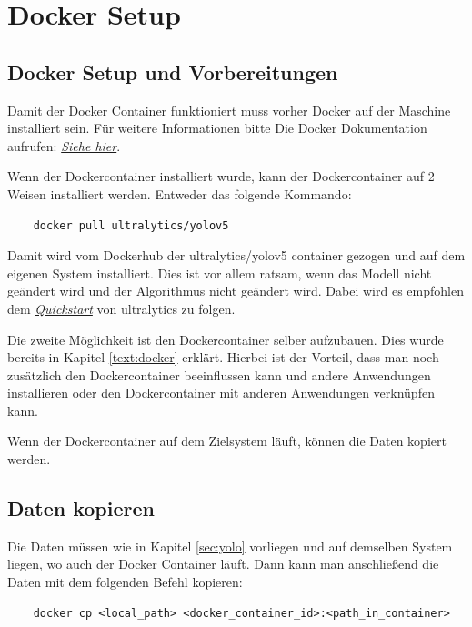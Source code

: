 \chapter{Docker Setup}
\section{Docker Setup und Vorbereitungen}
Damit der Docker Container funktioniert muss vorher Docker auf der Maschine installiert sein. Für weitere Informationen bitte Die Docker Dokumentation aufrufen: \textit{\href{https://www.docker.com/get-started/}{Siehe hier}}.

Wenn der Dockercontainer installiert wurde, kann der Dockercontainer auf 2 Weisen installiert werden. Entweder das folgende Kommando:

\begin{verbatim}
    docker pull ultralytics/yolov5
\end{verbatim}

Damit wird vom Dockerhub der ultralytics/yolov5 container gezogen und auf dem eigenen System installiert. Dies ist vor allem ratsam, wenn das Modell nicht geändert wird und der Algorithmus nicht geändert wird. Dabei wird es empfohlen dem \textit{\href{https://github.com/ultralytics/yolov5/wiki/Docker-Quickstart}{Quickstart}} von ultralytics zu folgen.

Die zweite Möglichkeit ist den Dockercontainer selber aufzubauen. Dies wurde bereits in Kapitel \ref{text:docker} erklärt. Hierbei ist der Vorteil, dass man noch zusätzlich den Dockercontainer beeinflussen kann und andere Anwendungen installieren oder den Dockercontainer mit anderen Anwendungen verknüpfen kann.

Wenn der Dockercontainer auf dem Zielsystem läuft, können die Daten kopiert werden.

\section{Daten kopieren}

Die Daten müssen wie in Kapitel \ref{sec:yolo} vorliegen und auf demselben System liegen, wo auch der Docker Container läuft. Dann kann man anschließend die Daten mit dem folgenden Befehl kopieren:

\begin{verbatim}
    docker cp <local_path> <docker_container_id>:<path_in_container>
\end{verbatim}

